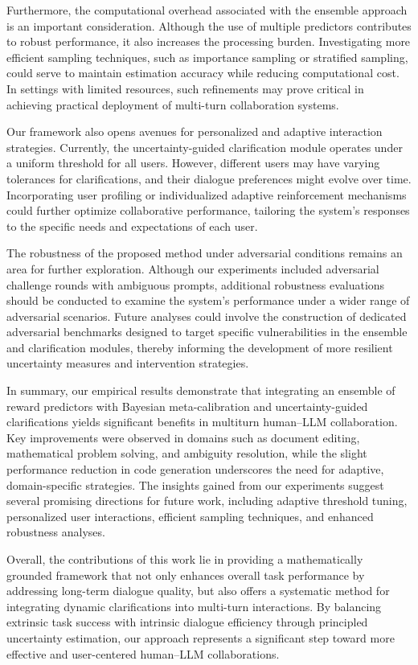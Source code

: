 \documentclass{article} %
\begin{document}
Furthermore, the computational overhead associated with the ensemble approach is an important consideration. Although the use of multiple predictors contributes to robust performance, it also increases the processing burden. Investigating more efficient sampling techniques, such as importance sampling or stratified sampling, could serve to maintain estimation accuracy while reducing computational cost. In settings with limited resources, such refinements may prove critical in achieving practical deployment of multi-turn collaboration systems.

Our framework also opens avenues for personalized and adaptive interaction strategies. Currently, the uncertainty-guided clarification module operates under a uniform threshold for all users. However, different users may have varying tolerances for clarifications, and their dialogue preferences might evolve over time. Incorporating user profiling or individualized adaptive reinforcement mechanisms could further optimize collaborative performance, tailoring the system's responses to the specific needs and expectations of each user.

The robustness of the proposed method under adversarial conditions remains an area for further exploration. Although our experiments included adversarial challenge rounds with ambiguous prompts, additional robustness evaluations should be conducted to examine the system's performance under a wider range of adversarial scenarios. Future analyses could involve the construction of dedicated adversarial benchmarks designed to target specific vulnerabilities in the ensemble and clarification modules, thereby informing the development of more resilient uncertainty measures and intervention strategies.

In summary, our empirical results demonstrate that integrating an ensemble of reward predictors with Bayesian meta-calibration and uncertainty-guided clarifications yields significant benefits in multiturn human–LLM collaboration. Key improvements were observed in domains such as document editing, mathematical problem solving, and ambiguity resolution, while the slight performance reduction in code generation underscores the need for adaptive, domain-specific strategies. The insights gained from our experiments suggest several promising directions for future work, including adaptive threshold tuning, personalized user interactions, efficient sampling techniques, and enhanced robustness analyses.

Overall, the contributions of this work lie in providing a mathematically grounded framework that not only enhances overall task performance by addressing long-term dialogue quality, but also offers a systematic method for integrating dynamic clarifications into multi-turn interactions. By balancing extrinsic task success with intrinsic dialogue efficiency through principled uncertainty estimation, our approach represents a significant step toward more effective and user-centered human–LLM collaborations.



\end{document}
